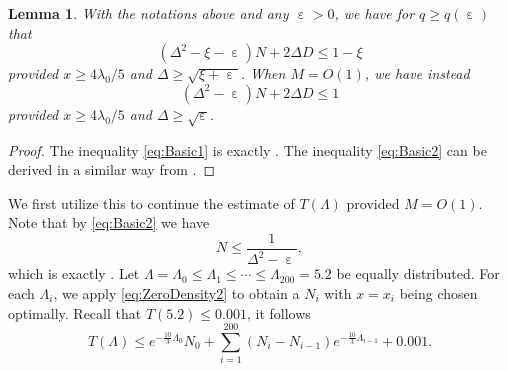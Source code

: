 \documentclass[10pt, reqno]{amsart}
\numberwithin{equation}{section}
\newtheorem{lemma}[theorem]{Lemma}
\renewcommand{\epsilon }{\operatorname{\varepsilon}}
\begin{document}
\begin{lemma}\label{lem:Density2}
With the notations above and any $\epsilon>0$, we have for $q\geq q(\epsilon)$ that
\begin{equation}\label{eq:Basic1}
(\Delta^2-\xi-\epsilon)N+ 2\Delta D \leq 1-\xi
\end{equation}
provided $x\geq 4\lambda_{0}/5$ and $\Delta\geq \sqrt{\xi+\epsilon}$. When $M=O(1)$, we have instead
\begin{equation}\label{eq:Basic2}
(\Delta^2-\epsilon)N+2\Delta D \leq 1
\end{equation}
provided $x\geq 4\lambda_0/5$ and $\Delta\geq \sqrt{\epsilon}$.
\end{lemma}

\begin{proof}
The inequality \eqref{eq:Basic1} is exactly \cite[Equation (8.3)]{Pintz2018}. The inequality \eqref{eq:Basic2} can be derived in a similar way from \cite[Equation (7.29)]{Pintz2018}.
\end{proof}

We first utilize this to continue the estimate of $T(\Lambda)$ provided $M=O(1)$. Note that by \eqref{eq:Basic2} we have
\begin{equation}\label{eq:ZeroDensity2}
N\leq \frac{1}{\Delta^2-\epsilon},
\end{equation}
which is exactly \cite[Theorem I]{Pintz2018}.
Let $\Lambda=\Lambda_0\leq \Lambda_1\leq \cdots \leq \Lambda_{200}=5.2$ be equally distributed. For each $\Lambda_i$, we apply \eqref{eq:ZeroDensity2} to obtain a $N_i$ with $x=x_i$ being chosen optimally. Recall that $T(5.2)\leq 0.001$, it follows
\begin{equation}\label{eq:TSum}
T(\Lambda)\leq e^{-\frac{10}{3} \Lambda_0} N_0+\sum_{i=1}^{200}(N_{i}-N_{i-1})e^{-\frac{10}{3} \Lambda_{i-1}}+0.001.
\end{equation}
\end{document}
